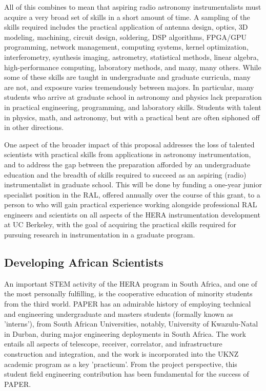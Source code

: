 \documentclass[preprint]{aastex}
\begin{document}
All of this combines to mean that aspiring radio astronomy instrumentalists must acquire a very broad
set of skills in a short amount of time.  A sampling of the skills required includes the practical
application of antenna design, optics,
3D modeling, machining, circuit design, soldering, DSP algorithms, FPGA/GPU programming, network management,
computing systems, kernel optimization, interferometry, synthesis imaging, astrometry, statistical methods, linear
algebra, high-performance
computing, laboratory methods, and many, many others.  While some of these skills are taught
in undergraduate and graduate
curricula, many are not, and exposure varies tremendously between majors.  In particular,
many students who arrive at graduate school in astronomy and physics
lack preparation in
practical engineering, programming, and laboratory skills.  Students with talent in physics, math, and astronomy,
but with a practical bent are often siphoned off in other directions.

One aspect of the broader impact of this proposal addresses the loss of talented
scientists with practical skills from applications in astronomy
instrumentation, and to address the gap between the preparation afforded by an
undergraduate education and the breadth of skills required to succeed as an
aspiring (radio) instrumentalist in graduate school.  This will be done by
funding a one-year junior specialist position in the RAL, offered annually over the course of this grant, to a
person to who will gain practical experience working alongside professional RAL engineers and scientists
on all aspects of the HERA instrumentation development at UC Berkeley, with the goal of
acquiring the practical skills required for
pursuing research in instrumentation in a graduate program.

\subsection{Developing African Scientists}

An important STEM activity of the HERA program in South Africa, and
one of the most personally fulfilling, is the cooperative education of
minority students from the third world. PAPER has an admirable history
of employing technical and engineering undergraduate and masters
students (formally known as 'interns'), from South African
Universities, notably, University of Kwazulu-Natal in Durban, during
major engineering deployments in South Africa. The work entails all
aspects of telescope, receiver, correlator, and infrastructure construction and
integration, and the work is incorporated into the UKNZ academic
program as a key 'practicum'. From the project perspective, this
student field engineering contribution has been fundamental for the
success of PAPER.
\end{document}
